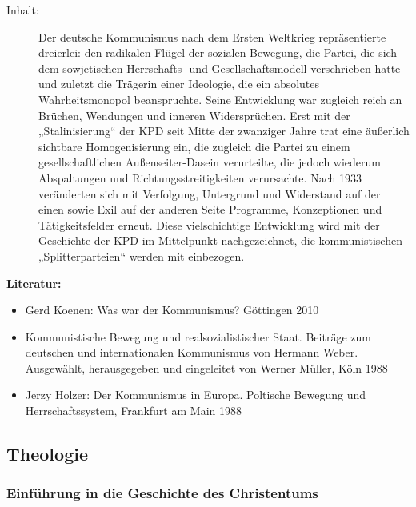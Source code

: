 \documentclass[%
a4paper, %
11pt,               %
leqno,              %
fleqn,              %
]
{scrartcl}
\begin{document}
\begin{description}
  \item[Inhalt:] Der deutsche Kommunismus nach dem Ersten Weltkrieg
    repräsentierte dreierlei: den radikalen Flügel der sozialen Bewegung, die
    Partei, die sich dem sowjetischen Herrschafts- und Gesellschaftsmodell
    verschrieben hatte und zuletzt die Trägerin einer Ideologie, die ein
    absolutes Wahrheitsmonopol beanspruchte. Seine Entwicklung war zugleich
    reich an Brüchen, Wendungen und inneren Widersprüchen. Erst mit der
    „Stalinisierung“ der KPD seit Mitte der zwanziger Jahre trat eine äußerlich
    sichtbare Homogenisierung ein, die zugleich die Partei zu einem
    gesellschaftlichen Außenseiter-Dasein verurteilte, die jedoch wiederum
    Abspaltungen und Richtungsstreitigkeiten verursachte. Nach 1933 veränderten
    sich mit Verfolgung, Untergrund und Widerstand auf der einen sowie Exil auf
    der anderen Seite Programme, Konzeptionen und Tätigkeitsfelder erneut. Diese
    vielschichtige Entwicklung wird mit der Geschichte der KPD im Mittelpunkt
    nachgezeichnet, die kommunistischen „Splitterparteien“ werden mit
    einbezogen.
\end{description}
\textsf{\textbf{Literatur:}}
\begin{itemize}\itemsep0pt
  \item Gerd Koenen: Was war der Kommunismus? Göttingen 2010
  \item Kommunistische Bewegung und realsozialistischer Staat. Beiträge zum
    deutschen und internationalen Kommunismus von Hermann Weber. Ausgewählt,
    herausgegeben und eingeleitet von Werner Müller, Köln 1988
  \item Jerzy Holzer: Der Kommunismus in Europa. Poltische Bewegung und
    Herrschaftssystem, Frankfurt am Main 1988
\end{itemize}



\subsection{Theologie} %
\label{sub:Theologie}

\subsubsection{Einführung in die Geschichte des Christentums} %
\label{ssub:Einführung in die Geschichte des Christentums}
\end{document}
